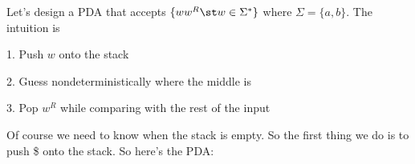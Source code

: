 \begin{eg}
Let's design a PDA that accepts $\{ww^R \st w \in \Sigma^*\}$
where $\Sigma = \{a, b\}$. 
The intuition is
\begin{mylist}
\item[1.] Push $w$ onto the stack
\item[2.] Guess nondeterministically where the middle is
\item[3.] Pop $w^R$ while comparing with the rest of the input
\end{mylist}
Of course we need to know when the stack is empty.
So the first thing we do is to push \$ onto the stack.
So here's the PDA:


\begin{center}
\end{center}
\end{eg}
